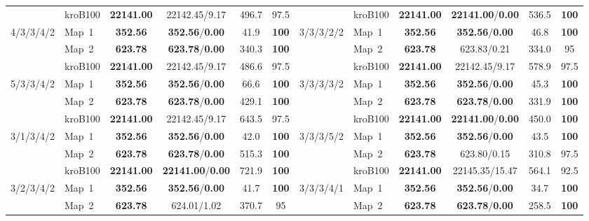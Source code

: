 \documentclass[lettersize,journal]{IEEEtran}
\begin{document}
\begin{table}[!t]
{\begin{tabular}{llcccc|llcccc}
& kroB100 & \textbf{22141.00} & 22142.45/9.17 & 496.7 & 97.5 & & kroB100 & \textbf{22141.00} & \textbf{22141.00}/\textbf{0.00} & 536.5 & \textbf{100} \\ \cline{2-6}\cline{8-12}
\multirow{3}{*}{4/3/3/4/2} & Map~1 & \textbf{352.56} & \textbf{352.56}/\textbf{0.00} & 41.9 & \textbf{100} & \multirow{3}{*}{3/3/3/2/2} & Map~1 & \textbf{352.56} & \textbf{352.56}/\textbf{0.00} & 46.8 & \textbf{100} \\
& Map~2 & \textbf{623.78} & \textbf{623.78}/\textbf{0.00} & 340.3 & \textbf{100} & & Map~2 & \textbf{623.78} & 623.83/0.21 & 334.0 & 95 \\
& kroB100 & \textbf{22141.00} & 22142.45/9.17 & 486.6 & 97.5 & & kroB100 & \textbf{22141.00} & 22142.45/9.17 & 578.9 & 97.5 \\ \cline{2-6}\cline{8-12}
\multirow{3}{*}{5/3/3/4/2} & Map~1 & \textbf{352.56} & \textbf{352.56}/\textbf{0.00} & 66.6 & \textbf{100} & \multirow{3}{*}{3/3/3/3/2} & Map~1 & \textbf{352.56} & \textbf{352.56}/\textbf{0.00} & 45.3 & \textbf{100} \\
& Map~2 & \textbf{623.78} & \textbf{623.78}/\textbf{0.00} & 429.1 & \textbf{100} & & Map~2 & \textbf{623.78} & \textbf{623.78}/\textbf{0.00} & 331.9 & \textbf{100} \\
& kroB100 & \textbf{22141.00} & 22142.45/9.17 & 643.5 & 97.5 & & kroB100 & \textbf{22141.00} & \textbf{22141.00}/\textbf{0.00} & 450.0 & \textbf{100} \\ \cline{2-6}\cline{8-12}
\multirow{3}{*}{3/1/3/4/2} & Map~1 & \textbf{352.56} & \textbf{352.56}/\textbf{0.00} & 42.0 & \textbf{100} & \multirow{3}{*}{3/3/3/5/2} & Map~1 & \textbf{352.56} & \textbf{352.56}/\textbf{0.00} & 43.5 & \textbf{100} \\
& Map~2 & \textbf{623.78} & \textbf{623.78}/\textbf{0.00} & 515.3 & \textbf{100} & & Map~2 & \textbf{623.78} & 623.80/0.15 & 310.8 & 97.5 \\
& kroB100 & \textbf{22141.00} & \textbf{22141.00}/\textbf{0.00} & 721.9 & \textbf{100} & & kroB100 & \textbf{22141.00} & 22145.35/15.47 & 564.1 & 92.5 \\ \cline{2-6}\cline{8-12}
\multirow{3}{*}{3/2/3/4/2} & Map~1 & \textbf{352.56} & \textbf{352.56}/\textbf{0.00} & 41.7 & \textbf{100} & \multirow{3}{*}{3/3/3/4/1} & Map~1 & \textbf{352.56} & \textbf{352.56}/\textbf{0.00} & 34.7 & \textbf{100} \\
& Map~2 & \textbf{623.78} & 624.01/1.02 & 370.7 & 95 & & Map~2 & \textbf{623.78} & \textbf{623.78}/\textbf{0.00} & 258.5 & \textbf{100} \\

\end{tabular}}
\end{table}
\end{document}
